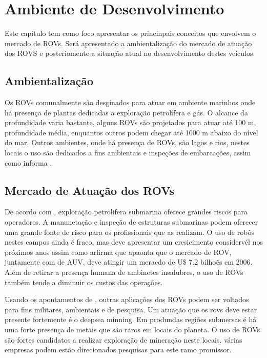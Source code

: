 \chapter{Ambiente de Desenvolvimento}

\label{chap:ambientalizacao}

Este capítulo tem  como foco apresentar os princinpais conceitos que envolvem o mercado de ROVs. Será apresentado a ambientalização do mercado de atuação dos ROVS e posteriomente a situação atual no desenvolvimento  destes veículos.

\section{Ambientalização}
Os ROVs comunalmente são desginados para atuar em ambiente marinhos onde há presença de plantas dedicadas a exploração petrolífera e gás.  O alcance da profundidade varia bastante, alguns ROVs são projetados para atuar até 100 m, profundidade média, enquantos outros podem chegar até 1000 m abaixo do nível do mar. Outros ambientes, onde há presença de ROVs, são lagos e rios, nestes locais o uso são dedicados a fins ambientais e inspeções de embarcações, assim como informa \cite{CBS}.  



\section{Mercado de Atuação dos ROVs}


De acordo com \cite{Bogue1}, exploração petrolifera submarina oferece grandes riscos para operadores. 
A manunetação e inspeção de estruturas submarinas podem oferecer uma grande fonte de risco para os profissionais que as realizam. O uso de robôs nestes campos ainda é fraco, mas deve apresentar um cresicimento considervél nos próximos anos assim como arfirma \cite{yahoo_finaces}  que apaonta que o mercado de ROV, juntamente com de AUV, deve atingir um meracdo de U\$ 7.2 bilhoẽs em 2006. Além de retirar a presença humana de ambinetes insalubres,  o uso de ROVs também tende a diminuir os custos das operações.

Usando os apontamentos de \cite{Bogue2}, outras aplicações dos ROVs podem ser voltados para fins militares, ambientais e de pesquisa. Um atuação que os rovs deve estar presente fortemente é o deepsea minning. Em produndas regiões submersas é há uma forte presença de metais que são raros em locais do planeta. O uso de ROVs são fortes candidatos a realizar exploração de mineração neste locais. várias empresas podem estão direcionados pesquisas para  este ramo promissor.


